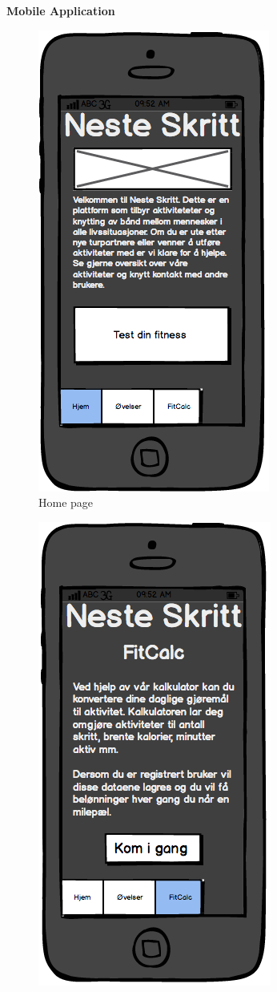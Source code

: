 \begin{figure}[H]
\centering
 \textbf{Mobile Application}\par\medskip
\begin{subfigure}{.5\textwidth}
  \centering
  \includegraphics[width=.5\linewidth]{wireframes/app/Home}
  \caption{Home page}
  \label{fig:appHome}
\end{subfigure}%
\begin{subfigure}{.5\textwidth}
  \centering
  \includegraphics[width=.5\linewidth]{wireframes/app/Test}

\end{subfigure}
\end{figure}
